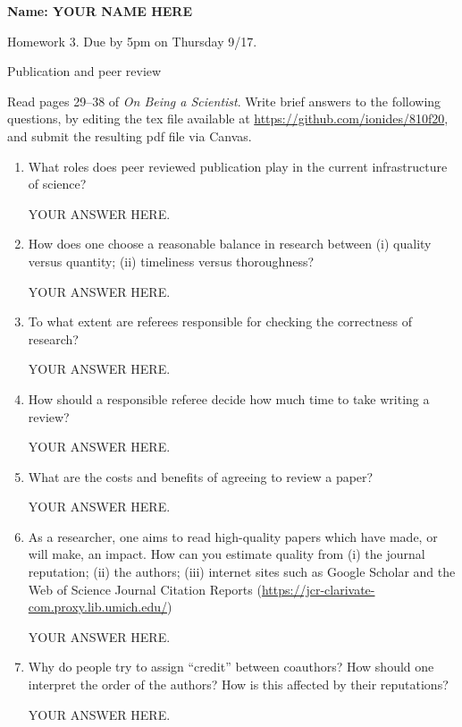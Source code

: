 \documentclass[12pt]{article}
\begin{document}
\begin{center}\bf
Name: YOUR NAME HERE

Homework 3. Due by 5pm on Thursday 9/17.

Publication and peer review

\end{center}

Read pages 29--38 of {\em On Being a Scientist}. Write brief answers to the following questions, by editing the tex file available at \url{https://github.com/ionides/810f20}, and submit the resulting pdf file via Canvas. 

\begin{enumerate}
\item What roles does peer reviewed publication play in the current infrastructure of science? 

YOUR ANSWER HERE.

\item How does one choose a reasonable balance in research between (i) quality versus quantity; (ii) timeliness versus thoroughness?

YOUR ANSWER HERE.

\item To what extent are referees responsible for checking the correctness of research? 

YOUR ANSWER HERE.

\item How should a responsible referee decide how much time to take writing a review? 

YOUR ANSWER HERE.

\item What are the costs and benefits of agreeing to review a paper?

YOUR ANSWER HERE.

\item As a researcher, one aims to read high-quality papers which have made, or will make, an impact. How can you estimate quality from (i) the journal reputation; (ii) the authors; (iii) internet sites such as Google Scholar and the Web of Science Journal Citation Reports (\url{https://jcr-clarivate-com.proxy.lib.umich.edu/})  

YOUR ANSWER HERE.

\item Why do people try to assign ``credit'' between coauthors? How should one interpret the order of the authors? How is this affected by their reputations? 

YOUR ANSWER HERE.


\end{enumerate}
\end{document}
